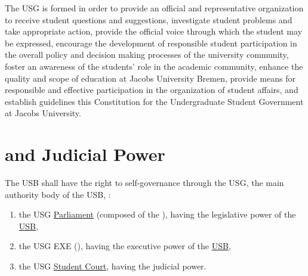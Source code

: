 The \ac{USG}\label{USGdef} is formed in order to provide an official and representative organization to receive student questions and suggestions, investigate student problems and take appropriate action, provide the official voice through which the student  may be expressed, encourage the development of responsible student participation in the overall policy and decision making processes of the university community, foster an awareness of the students' role in the academic community, enhance the quality and scope of education at Jacobs University Bremen, provide means for responsible and effective participation in the organization of student affairs, and establish guidelines  this Constitution for the Undergraduate Student Government at Jacobs University.


\section{ and Judicial Power} 
The \acf{USB}\label{USBdef} shall have the right to self-governance through the \acf{USG}, the main authority body of the USB, :
\begin{enumerate}
    \item the USG \hyperref[USGParliamentDef]{Parliament} \label{USGParliament} (composed of the ), having the legislative power of the \hyperref[studentbody]{USB},
    \item the USG \acl{EXE} (), having the executive power of the \hyperref[studentbody]{USB},
    \item the USG \hyperref[StudentCourtDef]{Student Court}, having the judicial power.
\end{enumerate}


